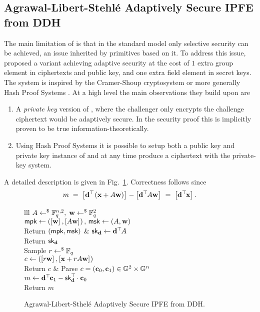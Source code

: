
\subsection{Agrawal-Libert-Stehl\'{e} Adaptively Secure IPFE from DDH}

The main limitation of \cite{PKC:ABDP15} is that in the standard model only selective security can be achieved, an issue inherited by primitives based on it.
To address this issue, \cite{C:AgrLibSte16} proposed a variant achieving adaptive security at the cost of $1$ extra group element in ciphertexts and public key, and one extra field element in secret keys.
The system is inspired by the Cramer-Shoup cryptosystem \cite{C:CraSho98} or more generally Hash Proof Systems \cite{EC:CraSho02}.
At a high level the main observations they build upon are
\begin{enumerate}
	\item A \textit{private key} version of \cite{PKC:ABDP15}, where the challenger only encrypts the challenge ciphertext would be adaptively secure.
	In the security proof this is implicitly proven to be true information-theoretically.
	
	\item Using Hash Proof Systems it is possible to setup both a public key and private key instance of \cite{PKC:ABDP15} and at any time produce a ciphertext with the private-key system.
\end{enumerate}

A detailed description is given in Fig.~\ref{prot:AgrLibSth16:IPFE}.
Correctness follows since
\[
	m
		\; = \;
 	\left[{\mathbf{d}^\top\hspace{-.1em} \left(\mathbf{x} + A \mathbf{w} \right)}\right]_{}
 		-
 	\left[{\mathbf{d}^\top\hspace{-.1em} A \mathbf{w}}\right]_{}
 		\; = \;
 	\left[{\mathbf{d}^\top\hspace{-.1em}\mathbf{x}}\right]_{}.
\]

\begin{figure}[htb]
\centering
\begin{pcarray}{lll}
		{
			$A \gets^{\$} \mathbb{F}_q^{n, 2}, \; \mathbf{w} \gets^{\$} \mathbb{F}_q^2$
				\\
			$\mathsf{mpk} \gets \left( \left[{\mathbf{w}}\right]_{}, \left[{A\mathbf{w}}\right]_{} \right), \, \mathsf{msk} \gets \left(A, \mathbf{w}\right)$
				\\
			Return $(\mathsf{mpk}, \mathsf{msk})$
		}
	&
		{
			$\mathsf{sk}_{\mathbf{d}} \gets \mathbf{d}^\top\hspace{-.1em} A$
				\\
			Return $\mathsf{sk}_{\mathbf{d}}$
		}
	\\
		{
			Sample $r \gets^{\$} \mathbb{F}_q$
				\\
			$c \gets \left(\left[{r \mathbf{w}}\right]_{}, \left[{\mathbf{x} + r A \mathbf{w}}\right]_{} \right)$
				\\
			Return $c$
		}
	&
		{
			Parse $c = (\mathbf{c}_0, \mathbf{c}_1) \in \mathbb{G}^2 \times \mathbb{G}^n$
				\\
			$m \gets \mathbf{d}^\top\hspace{-.1em} \mathbf{c}_1 - \mathsf{sk}_{\mathbf{d}}^\top\hspace{-.1em} \cdot \mathbf{c}_0$
				\\
			Return $m$
		}
\end{pcarray}
\caption{Agrawal-Libert-Sthel\'{e} Adaptively Secure IPFE from DDH.}
\label{prot:AgrLibSth16:IPFE}
\end{figure}

